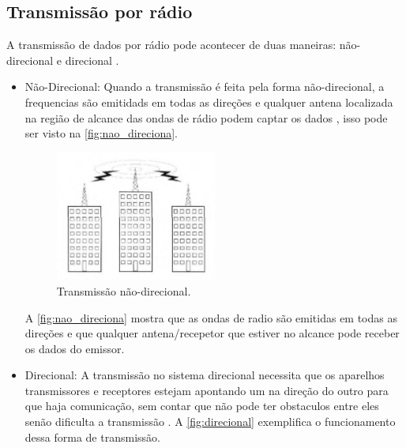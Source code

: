     \subsection{Transmissão por rádio}
        
        \par
        A transmissão de dados por rádio pode acontecer de duas maneiras: não-direcional e direcional  \cite{torres2001}.
        
        \begin{itemize}
        \item{Não-Direcional: }
        Quando a transmissão é feita pela forma não-direcional, a frequencias são emitidads em todas as direções e qualquer antena localizada na região de alcance das ondas de rádio podem captar os dados \cite{torres2001}, isso pode ser visto na \autoref{fig:nao_direciona}.
            \begin{figure}[H]
              \caption{\label{fig:nao_direciona}{Transmissão não-direcional.}}
              \centering
              \includegraphics[width=0.5\textwidth]{Figuras/transmissao_radio_nao_direcional.PNG}
            \end{figure}
        \par
        A  \autoref{fig:nao_direciona} mostra que as ondas de radio são emitidas em todas as direções e que qualquer antena/recepetor que estiver no alcance pode receber os dados do emissor.
        
        \item{Direcional: }
        A transmissão no sistema direcional necessita que os aparelhos transmissores e receptores estejam apontando um na direção do outro para que haja comunicação, sem contar que não pode ter obstaculos entre eles senão dificulta a transmissão \cite{torres2001}. A \autoref{fig:direcional} exemplifica o funcionamento dessa forma de transmissão.


\end{itemize}
